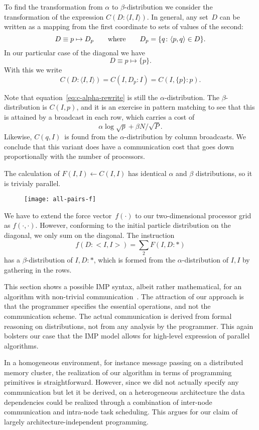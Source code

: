 To find the transformation from $\alpha$ to $\beta$-distribution
we consider the
transformation of the expression $C(D\colon\langle I,I\rangle)$.
In general, any set~$D$ can be written as a mapping from the first coordinate to
sets of values of the second:
\[ D\equiv p\mapsto D_p\qquad\hbox{where}\qquad
  D_p=\{q\colon \langle p,q\rangle\in D\}.
\]
In our particular case of the diagonal we have
\[ D\equiv p\mapsto\{p\}.\]
With this we write
\begin{equation}
C(D\colon \langle I,I\rangle) = C(I,D_p\colon I) = C(I,\{p\}\colon p).
\label{eq:c-alpha-rewrite}
\end{equation}

Note that equation~\eqref{eq:c-alpha-rewrite} is still the $\alpha$-distribution.
The $\beta$-distribution is $C(I,p)$, and it is an exercise in pattern matching to 
see that this is attained by a broadcast in each row, which carries a cost of
\[ \alpha \log\sqrt p + \beta N/\sqrt P. \]
Likewise, $C(q,I)$~is found from the $\alpha$-distribution by 
column broadcasts. We conclude that this variant does
have a communication cost that goes down proportionally
with the number of processors.


The calculation of $F(I,I)\leftarrow C(I,I)$ has identical $\alpha$ and $\beta$ 
distributions, so it is trivialy parallel.


\begin{wrapfigure}{r}{2in}
  \texttt{[image: all-pairs-f]}
\end{wrapfigure}
%
We have to extend the force vector~$f(\cdot)$ to our two-dimensional
processor grid as $f(\cdot,\cdot)$. However, conforming to the initial 
particle distribution on the diagonal, we only sum on the diagonal.
The instruction
\[ f(D\colon<I,I>)=\sum_2 F(I,D\colon *) \]
has a $\beta$-distribution of $I,D:*$, which is formed from the $\alpha$-distribution
of $I,I$ by gathering in the rows.


This section shows a possible \ac{IMP} syntax, albeit rather mathematical,
for an algorithm with non-trivial communication~\cite{Driscoll:optimal-nbody}.
The attraction of our approach is that the programmer specifies the essential
operations, and not the communication scheme.
The actual communication is derived from formal reasoning on distributions, not from
any analysis by the programmer. This again bolsters our case that 
the \ac{IMP} model allows for high-level
expression of parallel algorithms. 

In a homogeneous environment, for instance message passing on a distributed memory cluster,
the realization of our algorithm in terms of programming primitives is straightforward.
However, since we did not actually specify any communication but let it be derived,
on a heterogeneous architecture the data dependencies could be realized through a combination
of inter-node communication and intra-node task scheduling. This argues for our
claim of largely architecture-independent programming.

